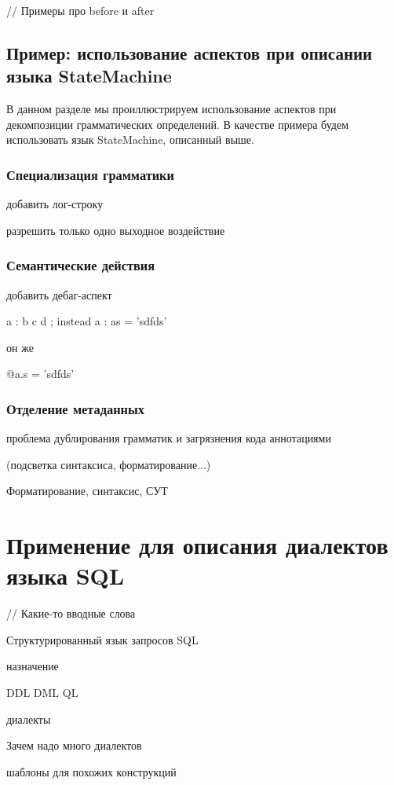 // Примеры про before и after

\section{Пример: использование аспектов при описании языка StateMachine}

В данном разделе мы проиллюстрируем использование аспектов при декомпозиции грамматических определений. В качестве примера будем использовать язык StateMachine, описанный выше.

\subsection{Специализация грамматики}
добавить лог-строку

разрешить только одно выходное воздействие

\subsection{Семантические действия}

добавить дебаг-аспект

a : b c d ;
	instead a : a{s = 'sdfds'}
	
	он же 
	
	@a.s = 'sdfds'

\subsection{Отделение метаданных}


проблема дублирования грамматик и загрязнения кода аннотациями

(подсветка синтаксиса, форматирование...)

Форматирование, синтаксис, СУТ
	

\chapter{Применение  для описания диалектов языка SQL}

// Какие-то вводные слова

Структурированный язык запросов SQL

назначение

DDL DML QL

диалекты

Зачем надо много диалектов

шаблоны для похожих конструкций

